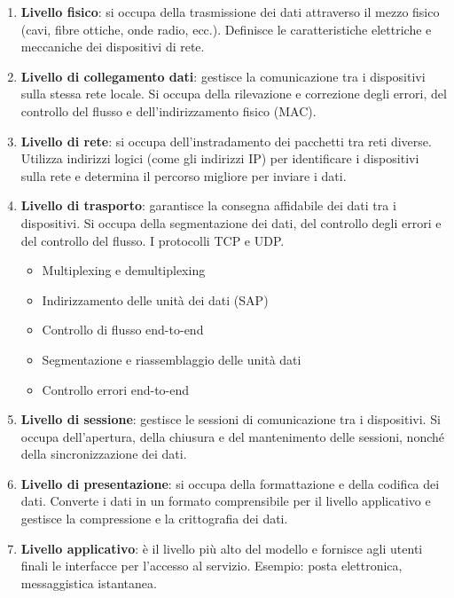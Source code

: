 \begin{enumerate}
    \item \textbf{Livello fisico}: si occupa della trasmissione dei dati attraverso il mezzo fisico (cavi, fibre ottiche, onde radio, ecc.). Definisce le caratteristiche elettriche e meccaniche dei dispositivi di rete.
    \item \textbf{Livello di collegamento dati}: gestisce la comunicazione tra i dispositivi sulla stessa rete locale. Si occupa della rilevazione e correzione degli errori, del controllo del flusso e dell'indirizzamento fisico (MAC).
    \item \textbf{Livello di rete}: si occupa dell'instradamento dei pacchetti tra reti diverse. Utilizza indirizzi logici (come gli indirizzi IP) per identificare i dispositivi sulla rete e determina il percorso migliore per inviare i dati.
    \item \textbf{Livello di trasporto}: garantisce la consegna affidabile dei dati tra i dispositivi. Si occupa della segmentazione dei dati, del controllo degli errori e del controllo del flusso. I protocolli TCP e UDP.
        \begin{multicols}{2}
            \begin{itemize}
                \item Multiplexing e demultiplexing
                \item Indirizzamento delle unità dei dati (SAP)
                \item Controllo di flusso end-to-end 
                \item Segmentazione e riassemblaggio delle unità dati
                \item Controllo errori end-to-end
            \end{itemize}
        \end{multicols}
    \item \textbf{Livello di sessione}: gestisce le sessioni di comunicazione tra i dispositivi. Si occupa dell'apertura, della chiusura e del mantenimento delle sessioni, nonché della sincronizzazione dei dati.
    \item \textbf{Livello di presentazione}: si occupa della formattazione e della codifica dei dati. Converte i dati in un formato comprensibile per il livello applicativo e gestisce la compressione e la crittografia dei dati.
    \item \textbf{Livello applicativo}: è il livello più alto del modello e fornisce agli utenti finali le interfacce per l'accesso al servizio. Esempio: posta elettronica, messaggistica istantanea. 
\end{enumerate}

